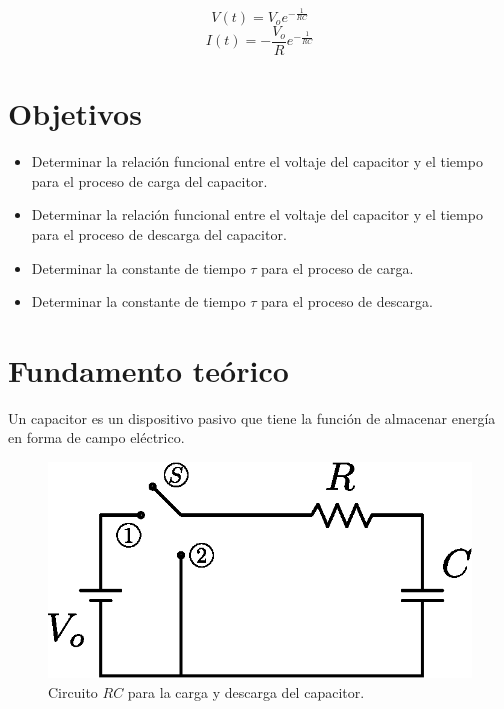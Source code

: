 \documentclass[letter,11pt]{article}
\begin{document}
\begin{enumerate}
\begin{equation*}
    V(t) = V_o e^{-\frac{1}{RC}}
\end{equation*}
\begin{equation*}
    I(t) = -\frac{V_o}{R} e^{-\frac{1}{RC}}
\end{equation*}
\end{enumerate}

\section{Objetivos}
\begin{itemize}
    \item Determinar la relación funcional entre el voltaje del capacitor y el
        tiempo para el proceso de carga del capacitor.
    \item Determinar la relación funcional entre el voltaje del capacitor y el
        tiempo para el proceso de descarga del capacitor.
    \item Determinar la constante de tiempo $\tau$ para el proceso de carga.
    \item Determinar la constante de tiempo $\tau$ para el proceso de descarga.
\end{itemize}

\section{Fundamento teórico}
Un capacitor es un dispositivo pasivo que tiene la función de almacenar energía
en forma de campo eléctrico.

\begin{figure}[!h]
\centering
\includegraphics[scale=0.75]{resources/figura1.eps}
\caption{Circuito $RC$ para la carga y descarga del capacitor.}
\label{figura1}
\end{figure}
\end{document}
